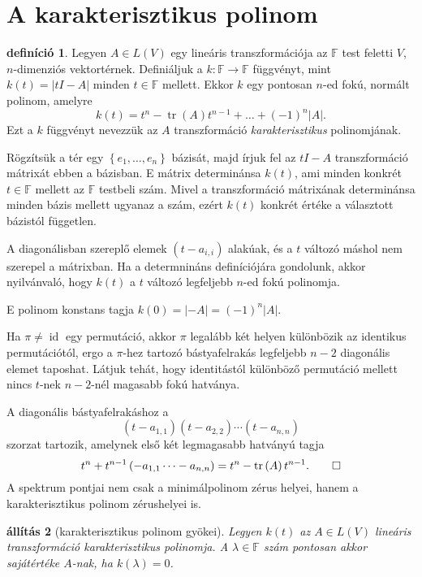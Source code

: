 \documentclass[a4paper, showtrims]{memoir}
\makeatletter
\renewenvironment{proof}[1][\proofname]
    {\par\pushQED{\qed}%
    \normalfont \topsep6\p@\@plus6\p@\relax
    \trivlist
    \item[\hskip\labelsep
        \itshape
    #1\@addpunct{:}]\ignorespaces}
    {\popQED\endtrivlist\@endpefalse}
\theoremstyle{plain}
\newtheorem{proposition}{állítás}[chapter]
\theoremstyle{remark}
\theoremstyle{definition}
\newtheorem{definition}[proposition]{definíció}
\DeclareMathOperator{\tr}{tr}
\DeclareMathOperator{\id}{id}
\makeatother
\begin{document}
\section{A karakterisztikus polinom}
\begin{definition}
	Legyen $A\in L\left( V \right)$ egy lineáris transzformációja az $\mathbb{F}$ test feletti $V$,
	$n$-dimenziós vektortérnek.
	Definiáljuk a $k:\mathbb{F}\to\mathbb{F}$ függvényt, mint
	$k\left( t \right)=|tI-A|$ minden $t\in\mathbb{F}$ mellett.
	Ekkor $k$ egy pontosan $n$-ed fokú, normált polinom,
	amelyre
	\[
		k\left( t \right)
		=
		t^n-\tr(A)t^{n-1}+\dots+\left( -1 \right)^n|A|.
	\]
	Ezt a $k$ függvényt nevezzük az
	$A$ transzformáció \emph{karakterisztikus}
	polinomjának.
\end{definition}
\begin{proof}
	Rögzítsük a tér egy $\left\{ e_1,\ldots,e_n \right\}$ bázisát,
	majd írjuk fel az $tI-A$ transzformáció mátrixát ebben a bázisban.
	E mátrix determinánsa $k\left( t \right)$,
	ami minden konkrét $t\in\mathbb{F}$ mellett az $\mathbb{F}$ testbeli szám.
	Mivel a transzformáció mátrixának determinánsa minden bázis mellett ugyanaz a szám,
	ezért $k\left( t \right)$ konkrét értéke a választott bázistól független.

	A diagonálisban szereplő elemek $\left( t-a_{i,i} \right)$ alakúak,
	és a $t$ változó máshol nem szerepel a mátrixban.
	Ha a determnináns definíciójára gondolunk, akkor nyilvánvaló, hogy $k\left( t \right)$ a $t$
	változó legfeljebb $n$-ed fokú polinomja.

	E polinom konstans tagja $k\left( 0 \right)=|-A|=\left( -1 \right)^n|A|.$

	Ha $\pi\neq\id$ egy permutáció,
	akkor $\pi$ legalább két helyen különbözik az identikus permutációtól,
	ergo a $\pi$-hez tartozó bástyafelrakás legfeljebb $n-2$ diagonális elemet taposhat.
	Látjuk tehát,
	hogy identitástól különböző permutáció mellett nincs $t$-nek $n-2$-nél magasabb fokú hatványa.

	A diagonális bástyafelrakáshoz a
	\[
		\left( t-a_{1,1} \right)\left( t-a_{2,2} \right)\cdots\left( t-a_{n,n} \right)
	\]
	szorzat tartozik, amelynek első két legmagasabb hatványú tagja
	\[
		t^n+t^{n-1}\left( -a_{1,1}\dots-a_{n,n} \right)=t^n-\tr\left( A \right)t^{n-1}.\qedhere
	\]
\end{proof}
A spektrum pontjai nem csak a minimálpolinom zérus helyei,
hanem a karakterisztikus polinom zérushelyei is.
\begin{proposition}[karakterisztikus polinom gyökei]
	Legyen $k\left( t \right)$ az $A\in L\left( V \right)$ lineáris transzformáció karakterisztikus polinomja.
	A $\lambda\in\mathbb{F}$ szám pontosan akkor sajátértéke $A$-nak,
	ha $k\left( \lambda \right)=0$.
\end{proposition}
\end{document}
